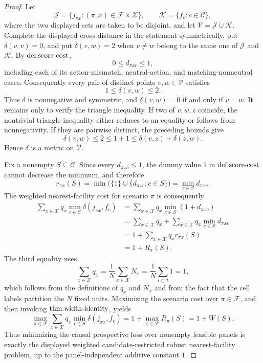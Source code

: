 \documentclass{article}
\begin{document}
\begin{proof}
Let
\[
\mathcal J=\{j_{\pi x}:(\pi,x)\in\mathcal F\times\mathcal X\},
\qquad
\mathcal K=\{f_c:c\in\mathcal C\},
\]
where the two displayed sets are taken to be disjoint, and let \(\mathcal V=\mathcal J\mathbin{\dot\cup}\mathcal K\).  Complete the displayed cross-distance in the statement symmetrically, put \(\delta(v,v)=0\), and put \(\delta(v,w)=2\) when \(v\neq w\) belong to the same one of \(\mathcal J\) and \(\mathcal K\).  By \(\textnormal{def:score-cost}\),
\[
0\leq d_{\pi xc}\leq 1,
\]
including each of its action-mismatch, neutral-action, and matching-nonneutral cases.  Consequently every pair of distinct points \(v,w\in\mathcal V\) satisfies
\[
1\leq\delta(v,w)\leq2.
\]
Thus \(\delta\) is nonnegative and symmetric, and \(\delta(v,w)=0\) if and only if \(v=w\).  It remains only to verify the triangle inequality.  If two of \(v,w,z\) coincide, the nontrivial triangle inequality either reduces to an equality or follows from nonnegativity.  If they are pairwise distinct, the preceding bounds give
\[
\delta(v,w)\leq2\leq1+1\leq\delta(v,z)+\delta(z,w).
\]
Hence \(\delta\) is a metric on \(\mathcal V\).

Fix a nonempty \(S\subseteq\mathcal C\).  Since every \(d_{\pi xc}\leq1\), the dummy value \(1\) in \(\textnormal{def:score-cost}\) cannot decrease the minimum, and therefore
\[
r_{\pi x}(S)
=\min\bigl(\{1\}\cup\{d_{\pi xc}:c\in S\}\bigr)
=\min_{c\in S}d_{\pi xc}.
\]
The weighted nearest-facility cost for scenario \(\pi\) is consequently
\[
\begin{aligned}
\sum_{x\in\mathcal X}q_x\min_{c\in S}
 \delta(j_{\pi x},f_c)
&=\sum_{x\in\mathcal X}q_x\min_{c\in S}(1+d_{\pi xc})\\
&=\sum_{x\in\mathcal X}q_x
  +\sum_{x\in\mathcal X}q_x\min_{c\in S}d_{\pi xc}\\
&=1+\sum_{x\in\mathcal X}q_xr_{\pi x}(S)\\
&=1+R_{\pi}(S).
\end{aligned}
\]
The third equality uses
\[
\sum_{x\in\mathcal X}q_x
=\frac{1}{N}\sum_{x\in\mathcal X}N_x
=\frac{1}{N}\sum_{i\in\mathcal I}1
=1,
\]
which follows from the definitions of \(q_x\) and \(N_x\) and from the fact that the cell labels partition the \(N\) fixed units.  Maximizing the scenario cost over \(\pi\in\mathcal F\), and then invoking \(\textnormal{thm:width-identity}\), yields
\[
\max_{\pi\in\mathcal F}
 \sum_{x\in\mathcal X}q_x\min_{c\in S}\delta(j_{\pi x},f_c)
=1+\max_{\pi\in\mathcal F}R_{\pi}(S)
=1+\overline W(S).
\]
Thus minimizing the causal prospective loss over nonempty feasible panels is exactly the displayed weighted candidate-restricted robust nearest-facility problem, up to the panel-independent additive constant \(1\).


\end{proof}
\end{document}
